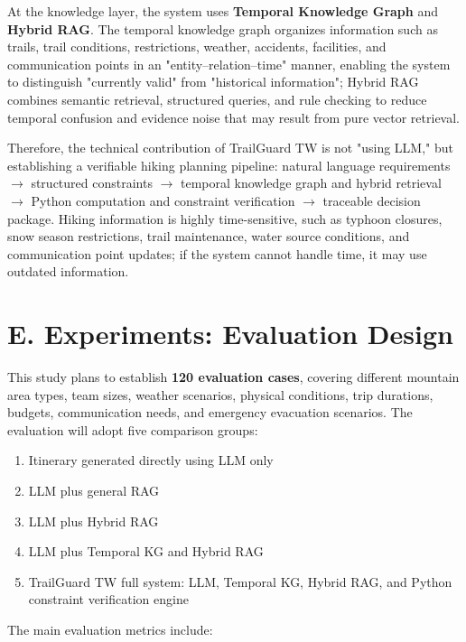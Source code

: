 \documentclass[conference]{IEEEtran}
\begin{document}
At the knowledge layer, the system uses \textbf{Temporal Knowledge Graph} and \textbf{Hybrid RAG}. The temporal knowledge graph organizes information such as trails, trail conditions, restrictions, weather, accidents, facilities, and communication points in an "entity--relation--time" manner, enabling the system to distinguish "currently valid" from "historical information"; Hybrid RAG combines semantic retrieval, structured queries, and rule checking to reduce temporal confusion and evidence noise that may result from pure vector retrieval.

Therefore, the technical contribution of TrailGuard TW is not "using LLM," but establishing a verifiable hiking planning pipeline: natural language requirements $\to$ structured constraints $\to$ temporal knowledge graph and hybrid retrieval $\to$ Python computation and constraint verification $\to$ traceable decision package. Hiking information is highly time-sensitive, such as typhoon closures, snow season restrictions, trail maintenance, water source conditions, and communication point updates; if the system cannot handle time, it may use outdated information.

\section{E. Experiments: Evaluation Design}

This study plans to establish \textbf{120 evaluation cases}, covering different mountain area types, team sizes, weather scenarios, physical conditions, trip durations, budgets, communication needs, and emergency evacuation scenarios. The evaluation will adopt five comparison groups:

\begin{enumerate}
\item Itinerary generated directly using LLM only
\item LLM plus general RAG
\item LLM plus Hybrid RAG
\item LLM plus Temporal KG and Hybrid RAG
\item TrailGuard TW full system: LLM, Temporal KG, Hybrid RAG, and Python constraint verification engine
\end{enumerate}

The main evaluation metrics include:
\end{document}
